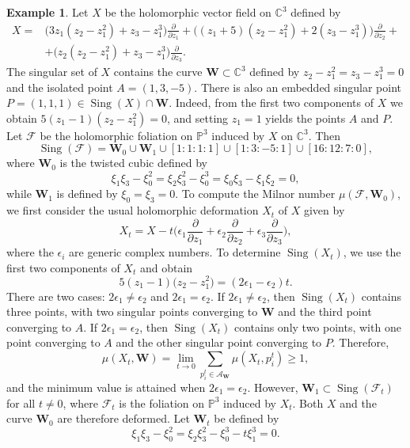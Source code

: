 \documentclass[10pt,twoside]{amsart}
\numberwithin{equation}{section}
\theoremstyle{definition}
\newtheorem{example}[proposition]{Example}
\theoremstyle{remark}
\DeclareMathOperator{\sing}{Sing}
\newcommand{\C}{\mathbb{C}}
\newcommand{\fol}{\mathcal{F}}
\newcommand{\W}{\mathbf{W}}
\begin{document}
\begin{example}
Let $X$ be the holomorphic vector field on $\C^3$ defined by
\begin{equation*}
\begin{array}{ll}
X=&\bigl(3z_1(z_2-z_1^2)+z_3-z_1^3\bigr)\frac{\partial}{\partial z_1}
+\bigl((z_1+5)(z_2-z_1^2)+2(z_3-z_1^3)\bigr)\frac{\partial}{\partial z_2}+\\
&+\bigl(z_2(z_2-z_1^2)+z_3-z_1^3\bigr)\frac{\partial}{\partial z_3}.
\end{array}
\end{equation*}
The singular set of $X$ contains the curve $\W\subset\C^3$ defined by
$
z_2-z_1^2=z_3-z_1^3=0
$
and the isolated point $A=(1,3,-5)$. There is also an embedded singular point
$P=(1,1,1)\in\sing(X)\cap\W$. Indeed, from the first two components of $X$ we obtain
$5(z_1-1)(z_2-z_1^2)=0$, and setting $z_1=1$ yields the points $A$ and $P$.
Let $\fol$ be the holomorphic foliation on $\mathbb{P}^3$ induced by $X$ on $\C^3$. Then
\[
\sing(\fol)=\W_0\cup \W_1\cup[1:1:1:1]\cup[1:3:-5:1]\cup[16:12:7:0],
\]
where $\W_0$ is the twisted cubic defined by
\[
\xi_1\xi_3-\xi_0^2=\xi_2\xi_3^2-\xi_0^3=\xi_0\xi_3-\xi_1\xi_2=0,
\]
while $\W_1$ is defined by $\xi_0=\xi_3=0$.
To compute the Milnor number $\mu(\fol,\W_0)$, we first consider the usual holomorphic deformation $X_t$ of $X$ given by
\begin{equation}\label{perb1}
X_t= X-t\bigg(\epsilon_1\frac{\partial}{\partial z_1}
+\epsilon_2\frac{\partial}{\partial z_2}
+\epsilon_3\frac{\partial}{\partial z_3}\bigg),
\end{equation}
where the $\epsilon_i$ are generic complex numbers. To determine $\sing(X_t)$, we use the first two components of $X_t$ and obtain
\[
5(z_1-1)\bigl(z_2-z_1^2\bigr)=(2\epsilon_1-\epsilon_2)t.
\]
There are two cases: $2\epsilon_1\neq\epsilon_2$ and $2\epsilon_1=\epsilon_2$.
If $2\epsilon_1\ne\epsilon_2$, then $\sing(X_t)$ contains three points, with two singular points converging to $\W$
and the third point converging to $A$.
If $2\epsilon_1=\epsilon_2$, then $\sing(X_t)$ contains only two points, with one point converging to $A$
and the other singular point converging to $P$. Therefore,
\[
\mu(X_t,\W)=\lim_{t\to0}\sum_{p_i^t\in\mathcal{A}_{\W}}\mu(X_t,p_i^t)\geq 1,
\]
and the minimum value is attained when $2\epsilon_1=\epsilon_2$.
However, $\W_1\subset\sing(\fol_t)$ for all $t\ne0$, where $\fol_t$ is the foliation on $\mathbb{P}^3$ induced by $X_t$.
Both $X$ and the curve $\W_0$ are therefore deformed. Let $\W_t$ be defined by
\[
\xi_1\xi_3-\xi_0^2=\xi_2\xi_3^2-\xi_0^3-t\xi_1^3=0.
\]
\end{example}
\end{document}
